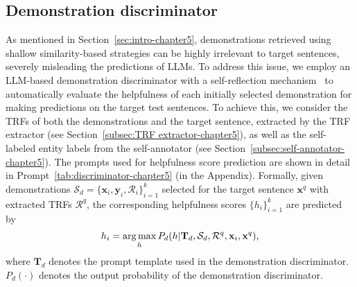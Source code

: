 \subsection{Demonstration discriminator}
\label{subsec:discriminator-chapter5}
As mentioned in Section~\ref{sec:intro-chapter5}, demonstrations retrieved using shallow similarity-based strategies can be highly irrelevant to target sentences, severely misleading the predictions of \acp{LLM}. To address this issue, we employ an \ac{LLM}-based demonstration discriminator with a self-reflection mechanism~\citep{DBLP:conf/iclr/AsaiWWSH24,DBLP:conf/nips/ShinnCGNY23} to automatically evaluate the helpfulness of each initially selected demonstration for making predictions on the target test sentences.
To achieve this, we consider the \acp{TRF} of both the demonstrations and the target sentence, extracted by the \ac{TRF} extractor (see Section~\ref{subsec:TRF extractor-chapter5}), as well as the self-labeled entity labels from the self-annotator (see Section~\ref{subsec:self-annotator-chapter5}). The prompts used for helpfulness score prediction are shown in detail in Prompt~\ref{tab:discriminator-chapter5} (in the Appendix). Formally, given demonstrations $\mathcal{S}_{d}=\{\mathbf{x}_i, \mathbf{y}_i, \mathcal{R}_{i}\}_{i=1}^k$ selected for the target sentence $\mathbf{x}^q$ with extracted \acp{TRF} $\mathcal{R}^q$, the corresponding helpfulness scores $\{h_i\}^k_{i=1}$ are predicted by
%
\begin{equation}
\setlength{\abovedisplayskip}{6pt}
\setlength{\belowdisplayskip}{6pt}
    h_i = \mathop{\arg\max}_h P_{d}(h|\mathbf{T}_d, \mathcal{S}_{d}, \mathcal{R}^q, \mathbf{x}_i, \mathbf{x}^q),
\end{equation}
%
where $\mathbf{T}_d$ denotes the prompt template used in the demonstration discriminator. $P_{d}(\cdot)$ denotes the output probability of the demonstration discriminator.

